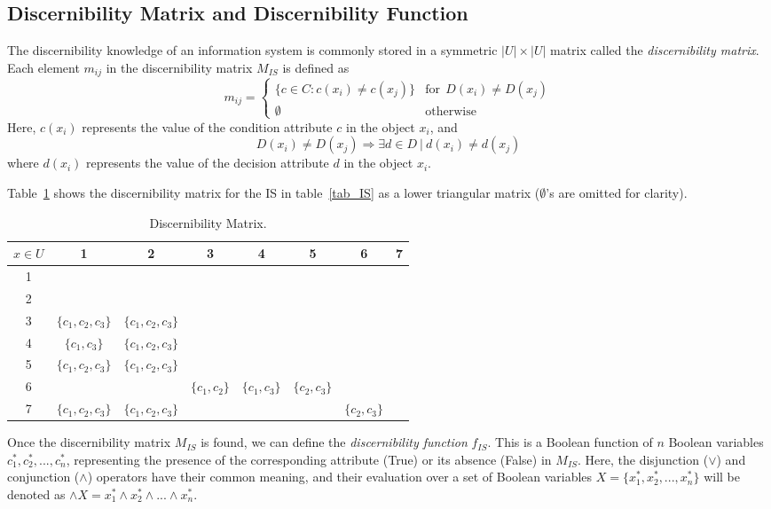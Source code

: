 \documentclass[citenumber]{llncs}
\begin{document}
\subsection{Discernibility Matrix and Discernibility Function}
  The discernibility knowledge of an information system is commonly stored in a symmetric $|U| \times |U|$
  matrix called the \textit{discernibility matrix}. Each element $m_{ij}$ in the discernibility matrix 
  $M_{IS}$ is defined as   
  \begin{equation}
  	m_{ij}=\left\lbrace\begin{array}{ll}
  			\lbrace c \in C: c(x_i) \neq c(x_j) \rbrace & \mathrm{for~~}D(x_i) \neq D(x_j)\\
  			\emptyset 								   & \mathrm{otherwise} 
  	\end{array}\right.
  \end{equation}  
  Here, $c(x_i)$ represents the value of the condition attribute $c$ in the object $x_i$, and 
  $$D(x_i) \neq D(x_j) \Rightarrow \exists d \in D~ |~ d(x_i) \neq d(x_j)$$ 
  where $d(x_i)$ represents the value  of the decision attribute $d$ in the object $x_i$.
  
  Table~\ref{tab_DM} shows the discernibility matrix for the IS in table~\ref{tab_IS} as a lower triangular 
  matrix ($\emptyset$'s are omitted for clarity).
  
   \begin{table}[htb]
		\caption{Discernibility Matrix.} \label{tab_DM}
		\centering
 	\begin{tabular}{c|ccccccc}
 		$x \in U$ & 1 & 2 &  3 & 4 & 5 &  6 & 7\\
 		\hline
		1 &&&&&&&\\
		2 &&&&&&&\\
		3 & $\lbrace c_1,c_2,c_3\rbrace$ & $\lbrace c_1,c_2,c_3\rbrace$ &&&&&\\
		4 & $\lbrace c_1,c_3\rbrace$ & $\lbrace c_1,c_2,c_3\rbrace$ &&&&&\\
		5 & $\lbrace c_1,c_2,c_3\rbrace$ & $\lbrace c_1,c_2,c_3\rbrace$ &&&&&\\
		6 &&& $\lbrace c_1,c_2\rbrace$ & $\lbrace c_1,c_3\rbrace$ & $\lbrace c_2,c_3\rbrace$ &&\\
		7 & $\lbrace c_1,c_2,c_3\rbrace$ & $\lbrace c_1,c_2,c_3\rbrace$ &&&& $\lbrace c_2,c_3\rbrace$ &\\
 	\end{tabular}             
 \end{table}
  
  Once the discernibility matrix $M_{IS}$ is found, we can define the \textit{discernibility function} $f_{IS}$. This is a Boolean function of $n$ Boolean variables $c_1^*, c_2^*,...,c_n^*$, representing the presence of the corresponding attribute (True) or its absence (False) in $M_{IS}$. Here, the disjunction ($\vee$) and conjunction ($\wedge$) operators have their common meaning, and their evaluation over a set of Boolean variables $X=\lbrace x_1^*, x_2^*, ..., x_n^* \rbrace$ will be denoted as $\wedge X= x_1^* \wedge x_2^* \wedge ... \wedge x_n^* $.
\end{document}
